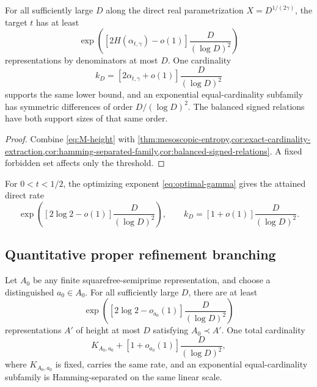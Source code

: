 \begin{corollary}
\label{cor:direct-height-form}
For all sufficiently large $D$ along the direct real parametrization $X=D^{1/(2\gamma)}$, the target $t$ has at least
\begin{equation}
\label{eq:direct-height-count}
 \exp\left(\left[2H(\alpha_{t,\gamma})-o(1)\right]
 \frac{D}{(\log D)^2}\right)
\end{equation}
representations by denominators at most $D$.  One cardinality
\begin{equation}
\label{eq:direct-height-cardinality}
 k_D=\left[2\alpha_{t,\gamma}+o(1)\right]
 \frac{D}{(\log D)^2}
\end{equation}
supports the same lower bound, and an exponential equal-cardinality subfamily has symmetric differences of order $D/(\log D)^2$.  The balanced signed relations have both support sizes of that same order.
\end{corollary}

\begin{proof}
Combine \cref{eq:M-height} with \cref{thm:mesoscopic-entropy,cor:exact-cardinality-extraction,cor:hamming-separated-family,cor:balanced-signed-relations}.  A fixed forbidden set affects only the threshold.
\end{proof}

For $0<t<1/2$, the optimizing exponent \cref{eq:optimal-gamma} gives the attained direct rate
\begin{equation}
\label{eq:optimal-direct-height-rate}
 \exp\left(\left[2\log2-o(1)\right]
 \frac{D}{(\log D)^2}\right),
 \qquad
 k_D=\left[1+o(1)\right]\frac{D}{(\log D)^2}.
\end{equation}

\subsection{Quantitative proper refinement branching}

\begin{corollary}
\label{cor:quantitative-refinement-branching}
Let $A_0$ be any finite squarefree-semiprime representation, and choose a distinguished $a_0\in A_0$.  For all sufficiently large $D$, there are at least
\begin{equation}
\label{eq:optimal-refinement-count}
 \exp\left(\left[2\log2-o_{a_0}(1)\right]
 \frac{D}{(\log D)^2}\right)
\end{equation}
representations $A'$ of height at most $D$ satisfying $A_0\prec A'$.  One total cardinality
\[
 K_{A_0,a_0}+\left[1+o_{a_0}(1)\right]\frac{D}{(\log D)^2},
\]
where $K_{A_0,a_0}$ is fixed, carries the same rate, and an exponential equal-cardinality subfamily is Hamming-separated on the same linear scale.
\end{corollary}

